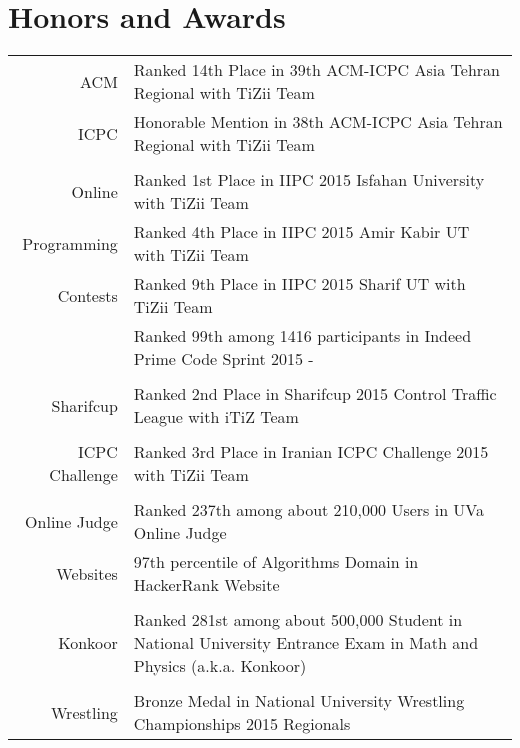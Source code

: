 \documentclass[a4paper,10pt]{article}
\newcommand{\linkSign}{
	{\footnotesize\space\faExternalLink}}
\newcommand{\ICPCLink}{https://icpc.baylor.edu/ICPCID/AW4BCNUI7GGZ}
\newcommand{\IndeedPrimePage}{https://www.hackerrank.com/indeed-prime-codesprint}
\newcommand{\IndeedPrimeRanks}{https://www.hackerrank.com/contests/indeed-prime-codesprint/leaderboard/10}
\newcommand{\SharifcupLink}{http://sharifcup.sharif.ir/\#!p=1036}
\newcommand{\ICPCChLink}{http://icpc.sharif.edu/acmicpc15/challenge-tournament/}
\newcommand{\UVaLink}{https://uva.onlinejudge.org/index.php?option=com_onlinejudge\&Itemid=20\&page=show_authorsrank\&limit=50\&limitstart=200}
\newcommand{\HackerRankLink}{https://www.hackerrank.com/imn_irdst}
\begin{document}
	\section{Honors and Awards}
	\begin{tabular}{r|p{11cm}}
		\textnormal{ACM} & {\small Ranked 14th Place in 39th ACM-ICPC Asia Tehran Regional with TiZii Team}\href{\ICPCLink}{\linkSign} \\
		\textnormal{ICPC}& {\small Honorable Mention in 38th ACM-ICPC Asia Tehran Regional with TiZii Team}\href{\ICPCLink}{\linkSign}\\
		\multicolumn{2}{c}{} \\
		
		\textnormal{Online} & {\small Ranked 1st Place in IIPC 2015 Isfahan University with TiZii Team} \href{\ICPCLink}{\linkSign}\\
		\textnormal{Programming} & {\small Ranked 4th Place in IIPC 2015 Amir Kabir UT with TiZii Team\href{\ICPCLink}{\linkSign}}\\
		\textnormal{Contests} & {\small Ranked 9th Place in IIPC 2015 Sharif UT with TiZii Team}\href{\ICPCLink}{\linkSign}\\
		& {\small Ranked 99th among 1416 participants in Indeed Prime Code Sprint 2015}\href{\IndeedPrimePage}{\linkSign}{ - }\href{\IndeedPrimeRanks}{\linkSign}\\
		\multicolumn{2}{c}{} \\
		
		\textnormal{Sharifcup} & {\small Ranked 2nd Place in Sharifcup 2015 Control Traffic League with iTiZ Team}\href{\SharifcupLink}{\linkSign}\\
		\multicolumn{2}{c}{} \\
		
		\textnormal{ICPC Challenge} & {\small Ranked 3rd Place in Iranian ICPC Challenge 2015 with TiZii Team}\href{\ICPCChLink}{\linkSign} \\
		\multicolumn{2}{c}{} \\
		
		\textnormal{Online Judge} & {\small Ranked 237th among about 210,000 Users in UVa Online Judge}\href{\UVaLink}{\linkSign} \\
		\textnormal{Websites} & {\small 97th percentile of Algorithms Domain in HackerRank Website}\href{\HackerRankLink}{\linkSign} \\
		\multicolumn{2}{c}{} \\
		
		\textnormal{Konkoor} & {\small Ranked 281st among about 500,000 Student in National University Entrance Exam in Math and Physics (a.k.a. Konkoor)}\\
		
		\multicolumn{2}{c}{} \\
		\textnormal{Wrestling} & {\small Bronze Medal in National University Wrestling Championships 2015 Regionals}\\
	\end{tabular}
\end{document}
